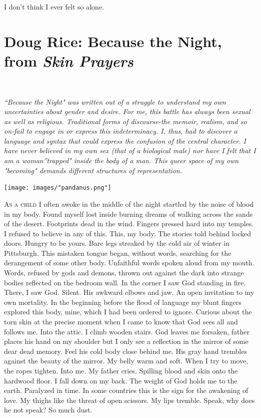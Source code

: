 \documentclass[
]{memoir}
\begin{document}
I don't think I ever felt so alone.

\hypertarget{doug-rice-because-the-night-from-skin-prayers}{%
\chapter{\texorpdfstring{Doug Rice: Because the Night, from \emph{Skin
Prayers}}{Doug Rice: Because the Night, from Skin Prayers}}\label{doug-rice-because-the-night-from-skin-prayers}}

~

\emph{``Because the Night" was written out of a struggle to understand
my own uncertainties about gender and desire. For me, this battle has
always been sexual as well as religious. Traditional forms of
discourse-the memoir, realism, and so on-fail to engage in or express
this indeterminacy. I, thus, had to discover a language and syntax that
could express the confusion of the central character. I have never
believed in my own sex (that of a biological male) nor have I felt that
I am a woman''trapped" inside the body of a man. This queer space of my
own "becoming" demands different structures of representation.}

\begin{center}\texttt{[image: images/"pandanus.png"]}\end{center}

\lettrine[lines=3, findent=0em, nindent=0.1em, lhang=0]{A}{s a child} I
often awoke in the middle of the night startled by the noise of blood in
my body. Found myself lost inside burning dreams of walking across the
sands of the desert. Footprints dead in the wind. Fingers pressed hard
into my temples. I refused to believe in any of this. This, my body. The
stories told behind locked doors. Hungry to be yours. Bare legs streaked
by the cold air of winter in Pittsburgh. This mistaken tongue began,
without words, searching for the derangement of some other body.
Unfaithful words spoken aloud from my mouth. Words, refused by gods and
demons, thrown out against the dark into strange bodies reflected on the
bedroom wall. In the corner I saw God standing in fire. There, I saw
God. Silent. His awkward elbows and jaw. An open invitation to my own
mortality. In the beginning before the flood of language my blunt
fingers explored this body, mine, which I had been ordered to ignore.
Curious about the torn skin at the precise moment when I came to know
that God sees all and follows me. Into the attic. I climb wooden stairs.
God leaves me forsaken, father places his hand on my shoulder but I only
see a reflection in the mirror of some dear dead memory. Feel his cold
body close behind me. His gray hand trembles against the beauty of the
mirror. My belly warm and soft. When I try to move, the ropes tighten.
Into me. My father cries. Spilling blood and skin onto the hardwood
floor. I fall down on my back. The weight of God holds me to the earth.
Paralyzed in time. In some countries this is the sign for the awakening
of love. My thighs like the threat of open scissors. My lips tremble.
Speak, why does he not speak? So much dust.
\end{document}
